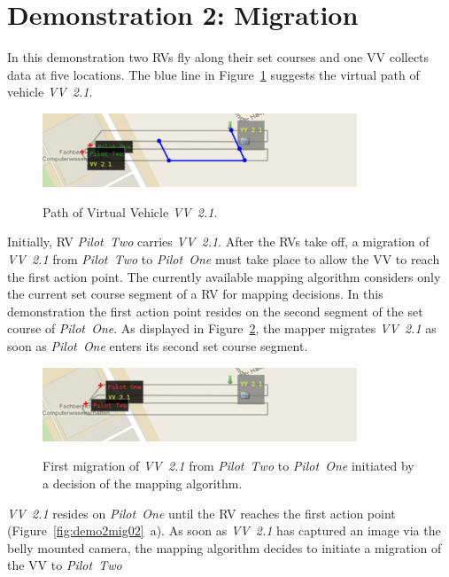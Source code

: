 \section{Demonstration 2: Migration}
In this demonstration two \acp{RV} fly along their set courses and one \ac{VV} collects data at five locations.
The blue line in Figure~\ref{fig:demo2vvPath} suggests the virtual path of vehicle \textit{VV~2.1}.
\begin{figure}[h]
	\begin{center}
		{\includegraphics[width=9.4cm]{ese-demo2-1.png}}
	\end{center}
	\caption{Path of Virtual Vehicle \textit{VV~2.1}.\label{fig:demo2vvPath}}
\end{figure}
Initially, \ac{RV} \textit{Pilot~Two} carries \textit{VV~2.1}. After the \acp{RV} take off, a migration
of \textit{VV~2.1} from \textit{Pilot~Two} to \textit{Pilot~One} must take place to allow the \ac{VV} to
reach the first action point. The currently available mapping algorithm considers only the current
set course segment of a \ac{RV} for mapping decisions.
In this demonstration the first action point resides on the second segment of the  set course of
\textit{Pilot~One}. As displayed in Figure~\ref{fig:demo2mig01}, the mapper migrates \textit{VV~2.1} as
soon as \textit{Pilot~One} enters its second set course segment. 
\begin{figure}[h]
	\begin{center}
		{\includegraphics[width=9.4cm]{ese-demo2-2.png}}
	\end{center}
	\caption{First migration of \textit{VV~2.1} from \textit{Pilot~Two} to \textit{Pilot~One}
	initiated by a decision of the mapping algorithm.\label{fig:demo2mig01}}
\end{figure}
\textit{VV~2.1} resides on \textit{Pilot~One} until the \ac{RV} reaches the first action point
(Figure~\ref{fig:demo2mig02}~a). As soon as \textit{VV~2.1} has captured an image via the belly mounted camera,
the mapping algorithm decides to initiate a migration of the \ac{VV} to \textit{Pilot~Two}
